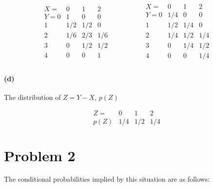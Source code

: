 \documentclass[11pt]{article}
\newcommand{\pr}[1]{\ensuremath{p(#1)}}
\begin{document}
\begin{equation}
    \begin{array}{r|ccc}
        X=  & 0 & 1 & 2 \\\hline
        Y=0 & 1 & 0 & 0 \\
        1 & 1/2 & 1/2 & 0 \\
        2 & 1/6 & 2/3 & 1/6 \\
        3 & 0 & 1/2 & 1/2 \\
        4 & 0 & 0 & 1 \\
    \end{array} \hspace{2cm}
    \begin{array}{r|ccc}
        X=  & 0 & 1 & 2 \\\hline
        Y=0 & 1/4 & 0 & 0 \\
        1 & 1/2 & 1/4 & 0 \\
        2 & 1/4 & 1/2 & 1/4 \\
        3 & 0 & 1/4 & 1/2 \\
        4 & 0 & 0 & 1/4 \\
    \end{array}
\end{equation}

\paragraph{(d)} The distribution of $Z = Y-X$, \pr{Z}

\begin{equation}
    \begin{array}{r|ccc}
        Z=  & 0 & 1 & 2 \\\hline
        \pr{Z} & 1/4 & 1/2 & 1/4
    \end{array}
\end{equation}

\section{Problem 2}

The conditional probabilities implied by this situation are as follows:
\end{document}
